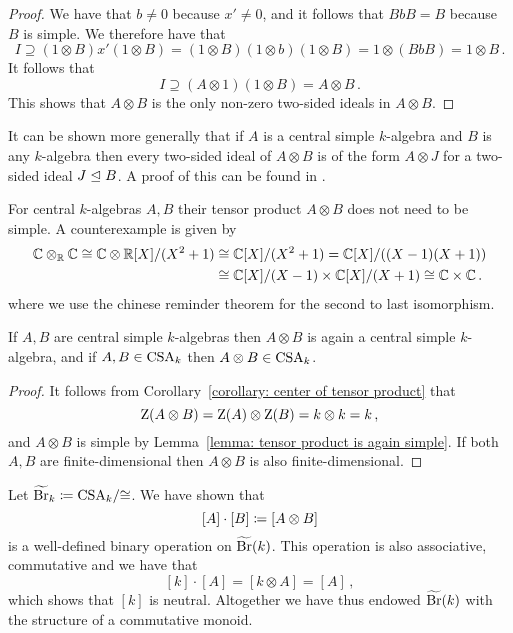 \begin{proof}
  We have that $b \neq 0$ because $x' \neq 0$, and it follows that $BbB = B$ because $B$ is simple.
  We therefore have that
  \[
              I
    \supseteq (1 \otimes B) x' (1 \otimes B)
    =         (1 \otimes B) (1 \otimes b) (1 \otimes B)
    =         1 \otimes (BbB)
    =         1 \otimes B \,.
  \]
  It follows that
  \[
              I
    \supseteq (A \otimes 1) (1 \otimes B)
    =         A \otimes B \,.
  \]
  This shows that $A \otimes B$ is the only non-zero two-sided ideals in $A \otimes B$.
\end{proof}


\begin{remark}
  It can be shown more generally that if $A$ is a central simple $k$-algebra and $B$ is any $k$-algebra then every two-sided ideal of $A \otimes B$ is of the form $A \otimes J$ for a two-sided ideal $J \trianglelefteq B$.
  A proof of this can be found in \cite[Lemma~4.1]{Clark2012NonCA}.
\end{remark}


\begin{warning}
  For central $k$-algebras $A, B$ their tensor product $A \otimes B$ does not need to be simple.
  A counterexample is given by
  \begin{align*}
            \mathbb{C} \otimes_{\mathbb{R}} \mathbb{C}
     \cong  \mathbb{C} \otimes \mathbb{R}[X]/(X^2 + 1)
    &\cong  \mathbb{C}[X]/(X^2 + 1)
     =      \mathbb{C}[X]/((X-1)(X+1))
    \\
    &\cong  \mathbb{C}[X]/(X-1) \times \mathbb{C}[X]/(X+1)
     \cong  \mathbb{C} \times \mathbb{C} \,.
  \end{align*}
  where we use the chinese reminder theorem for the second to last isomorphism.
\end{warning}


\begin{proposition}
  If $A, B$ are central simple $k$-algebras then $A \otimes B$ is again a central simple $k$-algebra, and if $A, B \in \operatorname{CSA}_k$ then $A \otimes B \in \operatorname{CSA}_k$.
\end{proposition}


\begin{proof}
  It follows from Corollary~\ref{corollary: center of tensor product} that
  \[
      \operatorname{Z}(A \otimes B)
    = \operatorname{Z}(A) \otimes \operatorname{Z}(B)
    = k \otimes k
    = k \,,
  \]
  and $A \otimes B$ is simple by Lemma~\ref{lemma: tensor product is again simple}.
  If both $A, B$ are finite-dimensional then $A \otimes B$ is also finite-dimensional.
\end{proof}


\begin{fluff}
  Let $\widetilde{\operatorname{Br}}_k \coloneqq \operatorname{CSA}_k\!/{\cong}$.
  We have shown that
  \[
              [A] \cdot [B]
    \coloneqq  [A \otimes B]
  \]
  is a well-defined binary operation on $\widetilde{\operatorname{Br}}(k)$.
  This operation is also associative, commutative and we have that
  \[
      [k] \cdot [A]
    = [k \otimes A]
    = [A] \,,
  \]
  which shows that $[k]$ is neutral.
  Altogether we have thus endowed $\widetilde{\operatorname{Br}}(k)$ with the structure of a commutative monoid.
\end{fluff}




